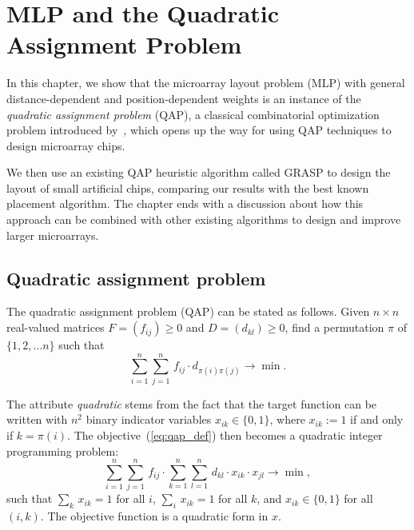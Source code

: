 \chapter{MLP and the Quadratic Assignment Problem}
\label{ch:qap}

In this chapter, we show that the microarray layout problem (MLP) with
general distance-dependent and position-dependent weights is an instance of the
\emph{quadratic assignment problem} (QAP), a classical combinatorial
optimization problem introduced by~\citet{Koopmans1957}, which opens up the way
for using QAP techniques to design microarray chips.

We then use an existing QAP heuristic algorithm called GRASP to design the
layout of small artificial chips, comparing our results with the best known
placement algorithm. The chapter ends with a discussion about how this approach
can be combined with other existing algorithms to design and improve larger
microarrays.

\section{Quadratic assignment problem}
\label{sec:qap_qap}

The quadratic assignment problem (QAP) can be stated as follows. Given
$n \times n$ real-valued matrices $F = (f_{ij})\geq 0$ and $D = (d_{kl})\geq 0$,
find a permutation $\pi$ of $\{1, 2, \ldots n\}$ such that
\begin{equation}\label{eq:qap_def}
  \sum_{i=1}^{n} \sum_{j=1}^{n}\,  f_{ij} \cdot d_{\pi(i)\pi(j)} \to \min.
\end{equation}

The attribute \emph{quadratic} stems from the fact that the target function can
be written with $n^2$ binary indicator variables $x_{ik}\in\{0,1\}$, where
$x_{ik}:=1$ if and only if $k=\pi(i)$. The objective~(\ref{eq:qap_def}) then
becomes a quadratic integer programming problem:
\[
  \sum_{i=1}^{n} \sum_{j=1}^{n}\,  f_{ij} \cdot 
  \sum_{k=1}^{n} \sum_{l=1}^{n}\,  d_{kl} \cdot x_{ik}\cdot x_{jl}
  \to \min,
\]
such that $\sum_{k}\, x_{ik}=1$ for all $i$, $\sum_{i}\, x_{ik}=1$ for all $k$,
and $x_{ik}\in\{0,1\}$ for all $(i,k)$. The objective function is a quadratic
form in $x$.


